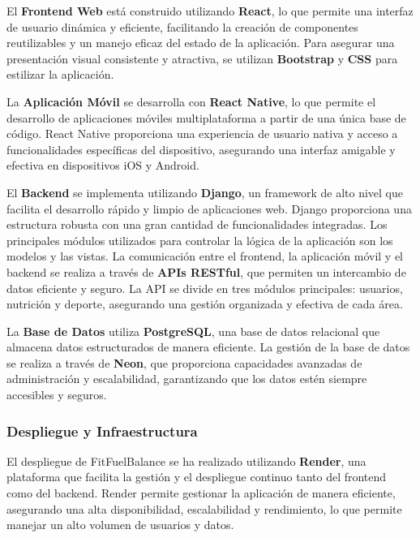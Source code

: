     El \textbf{Frontend Web} está construido utilizando \textbf{React}, lo que permite una interfaz de usuario dinámica y eficiente, facilitando la creación de componentes reutilizables y un manejo eficaz del estado de la aplicación. Para asegurar una presentación visual consistente y atractiva, se utilizan \textbf{Bootstrap} y \textbf{CSS} para estilizar la aplicación.
    
    La \textbf{Aplicación Móvil} se desarrolla con \textbf{React Native}, lo que permite el desarrollo de aplicaciones móviles multiplataforma a partir de una única base de código. React Native proporciona una experiencia de usuario nativa y acceso a funcionalidades específicas del dispositivo, asegurando una interfaz amigable y efectiva en dispositivos iOS y Android.
    
    El \textbf{Backend} se implementa utilizando \textbf{Django}, un framework de alto nivel que facilita el desarrollo rápido y limpio de aplicaciones web. Django proporciona una estructura robusta con una gran cantidad de funcionalidades integradas. Los principales módulos utilizados para controlar la lógica de la aplicación son los modelos y las vistas. La comunicación entre el frontend, la aplicación móvil y el backend se realiza a través de \textbf{APIs RESTful}, que permiten un intercambio de datos eficiente y seguro. La API se divide en tres módulos principales: usuarios, nutrición y deporte, asegurando una gestión organizada y efectiva de cada área.
    
    La \textbf{Base de Datos} utiliza \textbf{PostgreSQL}, una base de datos relacional que almacena datos estructurados de manera eficiente. La gestión de la base de datos se realiza a través de \textbf{Neon}, que proporciona capacidades avanzadas de administración y escalabilidad, garantizando que los datos estén siempre accesibles y seguros.
    

\subsubsection{Despliegue y Infraestructura}

El despliegue de FitFuelBalance se ha realizado utilizando \textbf{Render}, una plataforma que facilita la gestión y el despliegue continuo tanto del frontend como del backend. Render permite gestionar la aplicación de manera eficiente, asegurando una alta disponibilidad, escalabilidad y rendimiento, lo que permite manejar un alto volumen de usuarios y datos.
